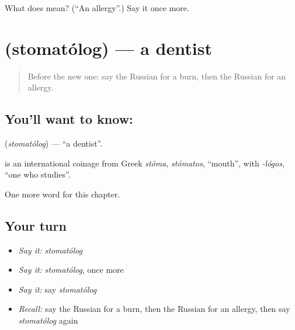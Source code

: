\begin{tcolorbox}[breakable,colback=teal!4,colframe=teal!35!black,title={Before you move on}]
What does  mean? (\textquotedblleft{}An allergy\textquotedblright{}.) Say it once more.
\end{tcolorbox}
\section[\texorpdfstring{\ru{стоматолог} (stomatólog)}{стоматолог (stomatólog)}]{ (stomatólog) — a dentist}

\label{lesson:RU-C210-stomatolog}



\begin{quote}
Before the new one: say the Russian for a burn, then the Russian for an allergy.
\end{quote}

\subsection*{You'll want to know: }
\textbf{} (\emph{stomatólog}) — \textquotedblleft{}a dentist\textquotedblright{}.

\begin{cousinweb}
\textbf{} is an international coinage from Greek \emph{stóma}, \emph{stómatos}, \textquotedblleft{}mouth\textquotedblright{}, with \emph{-lógos}, \textquotedblleft{}one who studies\textquotedblright{}.
\end{cousinweb}

\begin{grammarlens}[title={What you've built}]
One more word for this chapter.
\end{grammarlens}

\subsection*{Your turn}
\begin{itemize}
\raggedright
  \item \emph{Say it:} \emph{stomatólog}
  \item \emph{Say it:} \emph{stomatólog}, once more
  \item \emph{Say it:} say \emph{stomatólog}
  \item \emph{Recall:} say the Russian for a burn, then the Russian for an allergy, then say \emph{stomatólog} again
\end{itemize}

